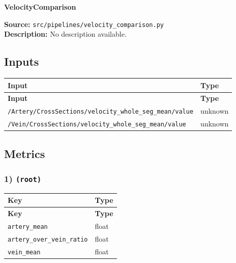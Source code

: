 \documentclass[11pt]{article}
\begin{document}
\begin{center}
\LARGE\textbf{VelocityComparison}
\end{center}
\textbf{Source:} \texttt{src/\allowbreak{}pipelines/\allowbreak{}velocity\_\allowbreak{}comparison.py}\\
\textbf{Description:} No description available.

\subsection*{Inputs}
\begin{longtable}{|p{}|p{}|}
\hline
\textbf{Input} & \textbf{Type} \\ \hline
\endfirsthead
\hline
\textbf{Input} & \textbf{Type} \\ \hline
\endhead
\texttt{/\allowbreak{}Artery/\allowbreak{}CrossSections/\allowbreak{}velocity\_\allowbreak{}whole\_\allowbreak{}seg\_\allowbreak{}mean/\allowbreak{}value} & unknown \\ \hline
\texttt{/\allowbreak{}Vein/\allowbreak{}CrossSections/\allowbreak{}velocity\_\allowbreak{}whole\_\allowbreak{}seg\_\allowbreak{}mean/\allowbreak{}value} & unknown \\ \hline
\end{longtable}

\subsection*{Metrics}
\subsubsection*{1) \texttt{(root)}}
\begin{longtable}{|p{}|p{}|}
\hline
\textbf{Key} & \textbf{Type} \\ \hline
\endfirsthead
\hline
\textbf{Key} & \textbf{Type} \\ \hline
\endhead
\texttt{artery\_\allowbreak{}mean} & float \\ \hline
\texttt{artery\_\allowbreak{}over\_\allowbreak{}vein\_\allowbreak{}ratio} & float \\ \hline
\texttt{vein\_\allowbreak{}mean} & float \\ \hline
\end{longtable}
\end{document}
